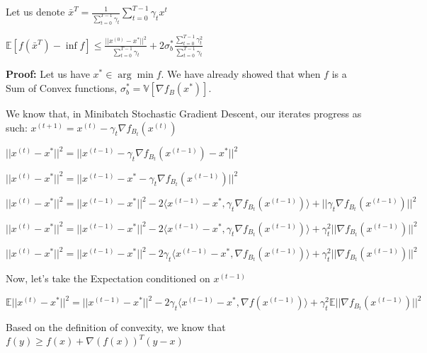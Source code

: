 Let us denote $\bar{x}^T = \frac{1}{\sum_{t = 0}^{T - 1} \gamma_t} \sum_{t = 0}^{T - 1} \gamma_t x^t$ \newline 

$\mathbb{E}[f(\bar{x}^T) - \inf f] \leq \frac{||x^{(0)} - x^*||^2}{\sum_{t = 0}^{T - 1} \gamma_t} + 2\sigma_b^* \frac{\sum_{t = 0}^{T - 1} \gamma_t^2}{\sum_{t = 0}^{T - 1} \gamma_t}$

\noindent \textbf{Proof:} \newline 
Let us have $x^* \in \arg \min f$. We have already showed that when $f$ is a Sum of Convex functions, $\sigma_b^* = \mathbb{V}[\nabla f_B(x^*)]$. 

We know that, in Minibatch Stochastic Gradient Descent, our iterates progress as such: $x^{(t + 1)}  = x^{(t)} - \gamma_t \nabla f_{B_t}(x^{(t)})$ \newline 

$||x^{(t)} - x^*||^2 = ||x^{(t - 1)} - \gamma_t \nabla f_{B_t}(x^{(t - 1)}) - x^*||^2$ \newline 

$||x^{(t)} - x^*||^2 = ||x^{(t - 1)} - x^* - \gamma_t \nabla f_{B_t}(x^{(t - 1)})||^2$ \newline 

$||x^{(t)} - x^*||^2 = ||x^{(t - 1)} - x^*||^2 - 2\langle x^{(t - 1)} - x^*,  \gamma_t \nabla f_{B_t}(x^{(t - 1)})\rangle + ||\gamma_t \nabla f_{B_t}(x^{(t - 1)})||^2$ \newline 

$||x^{(t)} - x^*||^2 = ||x^{(t - 1)} - x^*||^2 - 2\langle x^{(t - 1)} - x^*,  \gamma_t \nabla f_{B_t}(x^{(t - 1)})\rangle + \gamma_t^2 ||\nabla f_{B_t}(x^{(t - 1)})||^2$ \newline 

$||x^{(t)} - x^*||^2 = ||x^{(t - 1)} - x^*||^2 - 2\gamma_t \langle x^{(t - 1)} - x^*,  \nabla f_{B_t}(x^{(t - 1)})\rangle + \gamma_t^2 ||\nabla f_{B_t}(x^{(t - 1)})||^2$ \newline 

Now, let's take the Expectation conditioned on $x^{(t - 1)}$ \newline 

$\mathbb{E}||x^{(t)} - x^*||^2 = ||x^{(t - 1)} - x^*||^2 - 2\gamma_t \langle x^{(t - 1)} - x^*,  \nabla f(x^{(t - 1)})\rangle + \gamma_t^2 \mathbb{E}||\nabla f_{B_t}(x^{(t - 1)})||^2$ \newline 

Based on the definition of convexity, we know that $f(y) \geq f(x) + \nabla(f(x))^T (y - x)$ \newline 

